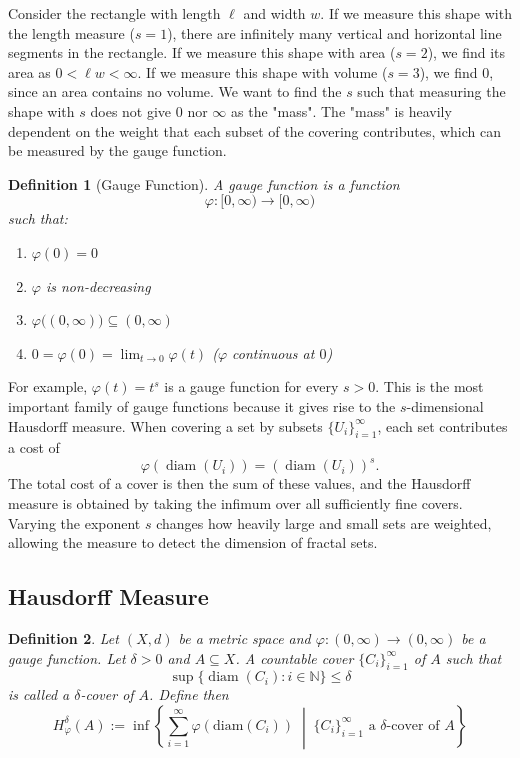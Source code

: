 \documentclass{article}
\newtheorem{definition}{Definition}
\begin{document}
Consider the rectangle with length $\ell$ and width $w$. If we measure this shape with the length measure ($s=1$), there are infinitely many vertical and horizontal line segments in the rectangle. If we measure this shape with area ($s=2$), we find its area as $0<\ell w < \infty$. If we measure this shape with volume ($s=3$), we find $0$, since an area contains no volume. We want to find the $s$ such that measuring the shape with $s$ does not give $0$ nor $\infty$ as the "mass". The "mass" is heavily dependent on the weight that each subset of the covering contributes, which can be measured by the gauge function.

\begin{definition}[Gauge Function]
A \textit{gauge function} is a function
\[
\varphi : [0,\infty) \to [0,\infty)
\]
such that:
\begin{enumerate}
    \item $\varphi(0) = 0$
    \item $\varphi$ is non-decreasing
    \item $\varphi\big((0,\infty)\big) \subseteq (0,\infty)$
    \item $0 = \varphi(0) = \displaystyle\lim_{t \to 0} \varphi(t)$ \quad ($\varphi$ continuous at $0$)
\end{enumerate}
\end{definition}

For example, $\varphi(t)=t^s$ is a gauge function for every $s>0$. This is the most important family of gauge functions because it gives rise to the $s$-dimensional Hausdorff measure. When covering a set by subsets $\{U_i\}_{i=1}^\infty$, each set contributes a cost of
\[
\varphi\!\left(\operatorname{diam}(U_i)\right)
=
\left(\operatorname{diam}(U_i)\right)^s.
\]
The total cost of a cover is then the sum of these values, and the Hausdorff measure is obtained by taking the infimum over all sufficiently fine covers. Varying the exponent $s$ changes how heavily large and small sets are weighted, allowing the measure to detect the dimension of fractal sets.

\subsection{Hausdorff Measure}

\begin{definition}
Let $(X,d)$ be a metric space and $\varphi : (0,\infty) \to (0,\infty)$ be a gauge function.
Let $\delta > 0$ and $A \subseteq X$. A countable cover $\{C_i\}_{i=1}^{\infty}$ of $A$ such that
\[
\sup\{\operatorname{diam}(C_i) : i \in \mathbb{N}\} \le \delta
\]
is called a \emph{$\delta$-cover of $A$}. Define then
\[
H_\varphi^\delta(A) := \inf\left\{ \sum_{i=1}^{\infty} \varphi(\text{diam}(C_i)) \;\middle|\; \{C_i\}_{i=1}^{\infty} \text{ a } \delta\text{-cover of } A \right\}
\]
\end{definition}
\end{document}
